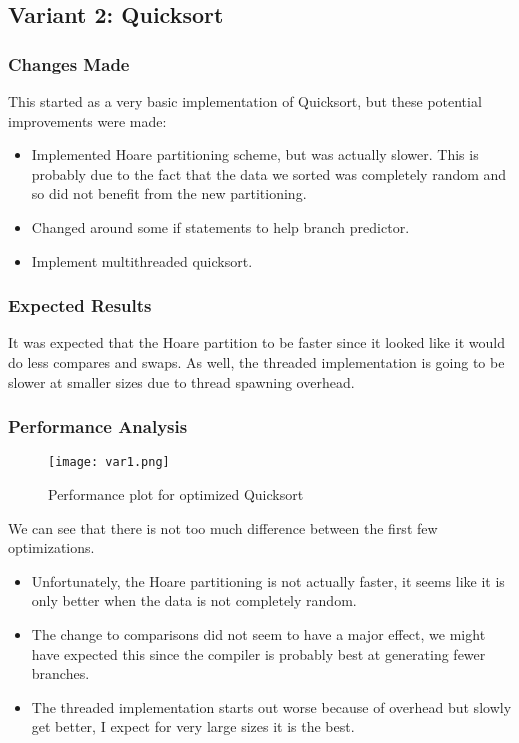 \documentclass[twocolumn]{article}
\begin{document}
\subsection{Variant 2: Quicksort}

\subsubsection{Changes Made}
This started as a very basic implementation of Quicksort, but these potential improvements were made:
\begin{itemize}
    \item Implemented Hoare partitioning scheme, but was actually slower. This is probably due to the fact that the data we sorted was completely random and so did not benefit from the new partitioning.
    \item Changed around some if statements to help branch predictor.
    \item Implement multithreaded quicksort.
\end{itemize}

\subsubsection{Expected Results}
It was expected that the Hoare partition to be faster since it looked like it would do less compares and swaps. As well, the threaded implementation is going to be slower at smaller sizes due to thread spawning overhead.

\subsubsection{Performance Analysis}
\begin{figure}[H]
    \centering
    \texttt{[image: var1.png]}
    \caption{Performance plot for optimized Quicksort}
    \label{fig:variant2_plot}
\end{figure}

We can see that there is not too much difference between the first few optimizations.
\begin{itemize}
    \item Unfortunately, the Hoare partitioning is not actually faster, it seems like it is only better when the data is not completely random.
    \item The change to comparisons did not seem to have a major effect, we might have expected this since the compiler is probably best at generating fewer branches.
	\item The threaded implementation starts out worse because of overhead but slowly get better, I expect for very large sizes it is the best.
\end{itemize}
\end{document}
